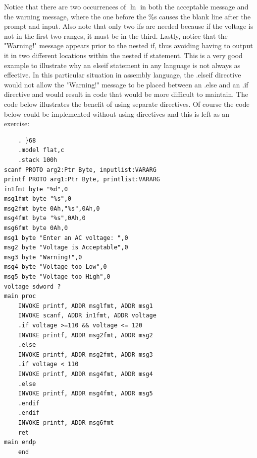 \documentclass[10pt]{book}
\begin{document}
Notice that there are two occurrences of $\ln$ in both the acceptable message and the warning message, where the one before the \%s causes the blank line after the prompt and input. Also note that only two ifs are needed because if the voltage is not in the first two ranges, it must be in the third. Lastly, notice that the "Warning!" message appears prior to the nested if, thus avoiding having to output it in two different locations within the nested if statement. This is a very good example to illustrate why an elseif statement in any language is not always as effective. In this particular situation in assembly language, the .elseif directive would not allow the "Warning!" message to be placed between an .else and an .if directive and would result in code that would be more difficult to maintain. The code below illustrates the benefit of using separate directives. Of course the code below could be implemented without using directives and this is left as an exercise:

\begin{verbatim}
    . }68
    .model flat,c
    .stack 100h
scanf PROTO arg2:Ptr Byte, inputlist:VARARG
printf PROTO arg1:Ptr Byte, printlist:VARARG
in1fmt byte "%d",0
msg1fmt byte "%s",0
msg2fmt byte 0Ah,"%s",0Ah,0
msg4fmt byte "%s",0Ah,0
msg6fmt byte 0Ah,0
msg1 byte "Enter an AC voltage: ",0
msg2 byte "Voltage is Acceptable",0
msg3 byte "Warning!",0
msg4 byte "Voltage too Low",0
msg5 byte "Voltage too High",0
voltage sdword ?
main proc
    INVOKE printf, ADDR msglfmt, ADDR msg1
    INVOKE scanf, ADDR in1fmt, ADDR voltage
    .if voltage >=110 && voltage <= 120
    INVOKE printf, ADDR msg2fmt, ADDR msg2
    .else
    INVOKE printf, ADDR msg2fmt, ADDR msg3
    .if voltage < 110
    INVOKE printf, ADDR msg4fmt, ADDR msg4
    .else
    INVOKE printf, ADDR msg4fmt, ADDR msg5
    .endif
    .endif
    INVOKE printf, ADDR msg6fmt
    ret
main endp
    end
\end{verbatim}
\end{document}
